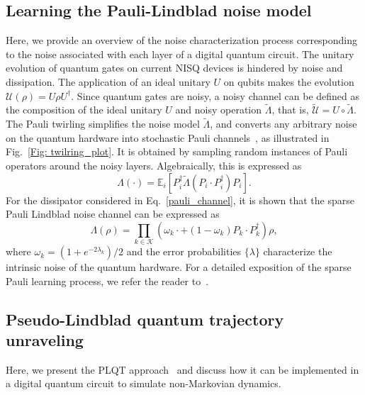 \documentclass[10pt, superscriptaddress,aps,pra,twocolumn,showpacs,nofootinbib, longbibliography, notitlepage,floatfix]{revtex4-2}
\begin{document}
\subsection*{Learning the Pauli-Lindblad noise model}\label{Pauli_noise_learning}
Here, we provide an overview of the noise characterization process corresponding to the noise associated with each layer of a digital quantum circuit. The unitary evolution of quantum gates on current NISQ devices is hindered by noise and dissipation. The application of an ideal unitary $U$ on qubits makes the evolution $\mathcal{U}(\rho) = U\rho U^{\dagger}$. Since quantum gates are noisy, a noisy channel can be defined as the composition of the ideal unitary $U$ and noisy operation $\tilde{\Lambda}$, that is, $\mathcal{\tilde{U}} = U \circ \tilde{\Lambda}$. The Pauli twirling simplifies the noise model $\tilde{\Lambda}$, and converts any arbitrary noise on the quantum hardware into stochastic Pauli channels~\cite{Flammia2020}, as illustrated in Fig.~\ref{Fig: twilring_plot}. It is obtained by sampling random instances of Pauli operators around the noisy layers. Algebraically, this is expressed as
\begin{equation}
    \Lambda(\cdot) = \mathbb{E}_i \left[ P_i^\dagger \tilde{\Lambda} \left( P_i \cdot P_i^\dagger \right) P_i \right].\label{noise_map}
\end{equation}
For the dissipator considered in Eq.~\eqref{pauli_channel}, it is shown that the sparse Pauli Lindblad noise channel can be expressed as~\cite{vandenBerg2023_natphys}
\begin{equation}
    \Lambda(\rho) = \prod_{k\in\mathcal{K}} \left( \omega_k \cdot + (1-\omega_k) P_k \cdot P_k^{\dagger} \right) \rho, \label{noise_channel_Lambda}
\end{equation}
where $\omega_k = (1+e^{-2\lambda_k})/2$ and the error probabilities $\{\lambda\}$ characterize the intrinsic noise of the quantum hardware. For a detailed exposition of the sparse Pauli learning process, we refer the reader to~\cite{vandenBerg2023_natphys, Ferracin2024efficiently}.

\subsection*{Pseudo-Lindblad quantum trajectory unraveling}\label{PLQT}
Here, we present the PLQT approach~\cite{Eckardt_PRL} and discuss how it can be implemented in a digital quantum circuit to simulate non-Markovian dynamics. 
\end{document}
